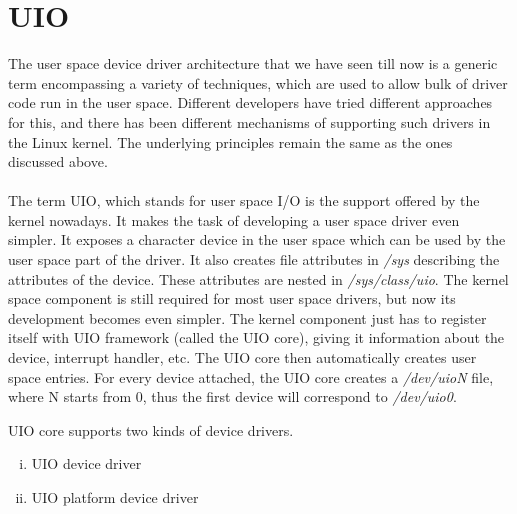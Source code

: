 \documentclass[twoside]{iitbreport}
\begin{document}
\section{UIO}
The user space device driver architecture that we have seen till now is a generic term encompassing a variety of techniques, which are used to allow bulk of driver code run in the user space. Different developers have tried different approaches for this, and there has been different mechanisms of supporting such drivers in the Linux kernel. The underlying principles remain the same as the ones discussed above.\\
\\
The term UIO, which stands for user space I/O is the support offered by the kernel nowadays. It makes the task of developing a user space driver even simpler. It exposes a character device in the user space which can be used by the user space part of the driver. It also creates file attributes in \textit{/sys} describing the attributes of the device. These attributes are nested in \textit{/sys/class/uio}. The kernel space component is still required for most user space drivers, but now its development becomes even simpler. The kernel component just has to register itself with UIO framework (called the UIO core), giving it information about the device, interrupt handler, etc. The UIO core then automatically creates user space entries. For every device attached, the UIO core creates a \textit{/dev/uioN} file, where N starts from 0, thus the first device will correspond to \textit{/dev/uio0}.

UIO core supports two kinds of device drivers.

\begin{enumerate}[(i)]
\item UIO device driver
\item UIO platform device driver
\end{enumerate}
\end{document}
